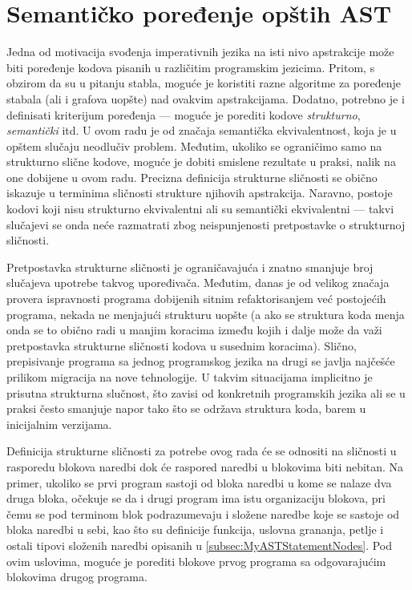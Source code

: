 \chapter{Semantičko poređenje opštih AST}
\label{chp:ASTComparing}

Jedna od motivacija svođenja imperativnih jezika na isti nivo apstrakcije može biti poređenje kodova pisanih u različitim programskim jezicima. Pritom, s obzirom da su u pitanju stabla, moguće je koristiti razne algoritme za poređenje stabala (ali i grafova uopšte) nad ovakvim apstrakcijama. Dodatno, potrebno je i definisati kriterijum poređenja --- moguće je porediti kodove \emph{strukturno}, \emph{semantički} itd. U ovom radu je od značaja semantička ekvivalentnost, koja je u opštem slučaju neodlučiv problem. Međutim, ukoliko se ograničimo samo na strukturno slične kodove, moguće je dobiti smislene rezultate u praksi, nalik na one dobijene u ovom radu. Precizna definicija strukturne sličnosti se obično iskazuje u terminima sličnosti strukture njihovih apstrakcija. Naravno, postoje kodovi koji nisu strukturno ekvivalentni ali su semantički ekvivalentni --- takvi slučajevi se onda neće razmatrati zbog neispunjenosti pretpostavke o strukturnoj sličnosti. 

Pretpostavka strukturne sličnosti je ograničavajuća i znatno smanjuje broj slučajeva upotrebe takvog upoređivača. Međutim, danas je od velikog značaja provera ispravnosti programa dobijenih sitnim refaktorisanjem već postojećih programa, nekada ne menjajući strukturu uopšte (a ako se struktura koda menja onda se to obično radi u manjim koracima između kojih i dalje može da važi pretpostavka strukturne sličnosti kodova u susednim koracima). Slično, prepisivanje programa sa jednog programskog jezika na drugi se javlja najčešće prilikom migracija na nove tehnologije. U takvim situacijama implicitno je prisutna strukturna slučnost, što zavisi od konkretnih programskih jezika ali se u praksi često smanjuje napor tako što se održava struktura koda, barem u inicijalnim verzijama. 

Definicija strukturne sličnosti za potrebe ovog rada će se odnositi na sličnosti u rasporedu blokova naredbi dok će raspored naredbi u blokovima biti nebitan. Na primer, ukoliko se prvi program sastoji od bloka naredbi u kome se nalaze dva druga bloka, očekuje se da i drugi program ima istu organizaciju blokova, pri čemu se pod terminom blok podrazumevaju i složene naredbe koje se sastoje od bloka naredbi u sebi, kao što su definicije funkcija, uslovna grananja, petlje i ostali tipovi složenih naredbi opisanih u \ref{subsec:MyASTStatementNodes}. Pod ovim uslovima, moguće je porediti blokove prvog programa sa odgovarajućim blokovima drugog programa.




